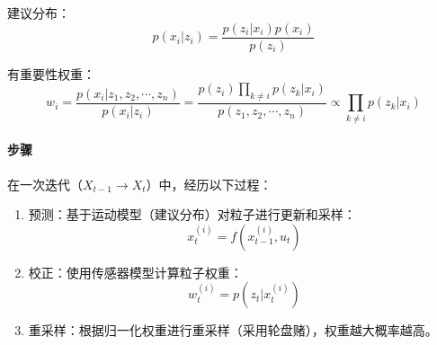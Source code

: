 \documentclass[
12pt, %
a4paper, 
oneside, %
headinclude,footinclude, %
]{scrartcl}
\begin{document}
建议分布：
$$ p(x_i|z_i) = \frac{p(z_i|x_i)p(x_i)}{p(z_i)} $$

有重要性权重：
$$ w_i = \frac{p(x_i|z_1, z_2, \cdots, z_n)}{p(x_i|z_i)} = \frac{p(z_i)\prod_{k\neq i}p(z_k|x_i)}{p(z_1, z_2, \cdots, z_n)} \propto \prod_{k \neq i}p(z_k|x_i) $$
\paragraph{步骤}
在一次迭代（$ X_{t - 1} \rightarrow X_t $）中，经历以下过程：
\begin{enumerate}
\item 预测：基于运动模型（建议分布）对粒子进行更新和采样：
$$ x_t^{(i)} = f(x_{t - 1}^{(i)}, u_t) $$
\item 校正：使用传感器模型计算粒子权重：
$$ w_t^{(i)} = p(z_t | x_t^{(i)}) $$
\item 重采样：根据归一化权重进行重采样（采用轮盘赌），权重越大概率越高。
\end{enumerate}
\end{document}
